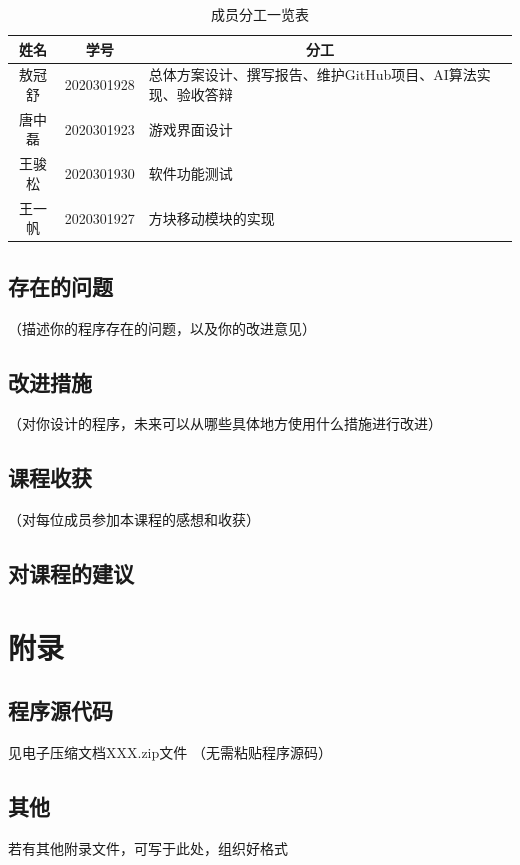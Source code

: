 \documentclass[UTF8,AutoFakeBold,AutoFakeSlant,zihao=-4]{ctexart}
\begin{document}
\begin{table}[!ht]
  \centering
  \caption{成员分工一览表}
  \label{tab:progress}
  \begin{tabular}{@{}cllc@{}}
    \toprule
    姓名 & \multicolumn{1}{c}{学号} & \multicolumn{1}{c}{分工}    \\ \midrule
    敖冠舒 & 2020301928          & 总体方案设计、撰写报告、维护GitHub项目、AI算法实现、验收答辩     \\
    唐中磊 & 2020301923          & 游戏界面设计                   \\
    王骏松 & 2020301930          & 软件功能测试  \\ 
    王一帆 & 2020301927          & 方块移动模块的实现              \\ \bottomrule
  \end{tabular}
\end{table}

\subsection{存在的问题}
（描述你的程序存在的问题，以及你的改进意见）

\subsection{改进措施}
（对你设计的程序，未来可以从哪些具体地方使用什么措施进行改进）

\subsection{课程收获}
（对每位成员参加本课程的感想和收获）

\subsection{对课程的建议}



\clearpage
\section{附录}
\subsection{程序源代码}
见电子压缩文档XXX.zip文件
（无需粘贴程序源码）

\subsection{其他}
若有其他附录文件，可写于此处，组织好格式
\end{document}

